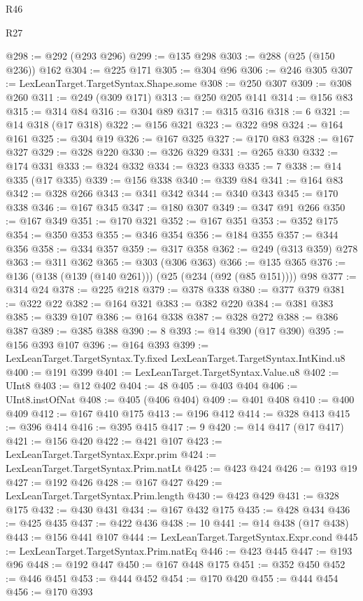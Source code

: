 \begin{lexlean}{R46}
\begin{lexlean}{R27}
\begin{coremodule}
{{{{{{{{{{{{{{{{{{{{{{{{{{{{{{{{{{{{{{{{{{{{{{{{{{{{{{{{{{{{{{@298 := @292 (@293 @296)
@299 := @135 @298
@303 := @288 (@25 (@150 @236)) @162
@304 := @225 @171
@305 := @304 @96
@306 := @246 @305
@307 := LexLeanTarget.TargetSyntax.Shape.some
@308 := @250 @307
@309 := @308 @260
@311 := @249 (@309 @171)
@313 := @250 @205 @141
@314 := @156 @83
@315 := @314 @84
@316 := @304 @89
@317 := @315 @316
@318 := 6
@321 := @14 @318 (@17 @318)
@322 := @156 @321
@323 := @322 @98
@324 := @164 @161
@325 := @304 @19
@326 := @167 @325
@327 := @170 @83
@328 := @167 @327
@329 := @328 @220
@330 := @326 @329
@331 := @265 @330
@332 := @174 @331
@333 := @324 @332
@334 := @323 @333
@335 := 7
@338 := @14 @335 (@17 @335)
@339 := @156 @338
@340 := @339 @84
@341 := @164 @83
@342 := @328 @266
@343 := @341 @342
@344 := @340 @343
@345 := @170 @338
@346 := @167 @345
@347 := @180 @307
@349 := @347 @91 @266
@350 := @167 @349
@351 := @170 @321
@352 := @167 @351
@353 := @352 @175
@354 := @350 @353
@355 := @346 @354
@356 := @184 @355
@357 := @344 @356
@358 := @334 @357
@359 := @317 @358
@362 := @249 (@313 @359) @278
@363 := @311 @362
@365 := @303 (@306 @363)
@366 := @135 @365
@376 := @136 (@138 (@139 (@140 @261))) (@25 (@234 (@92 (@85 @151)))) @98
@377 := @314 @24
@378 := @225 @218
@379 := @378 @338
@380 := @377 @379
@381 := @322 @22
@382 := @164 @321
@383 := @382 @220
@384 := @381 @383
@385 := @339 @107
@386 := @164 @338
@387 := @328 @272
@388 := @386 @387
@389 := @385 @388
@390 := 8
@393 := @14 @390 (@17 @390)
@395 := @156 @393 @107
@396 := @164 @393
@399 := LexLeanTarget.TargetSyntax.Ty.fixed LexLeanTarget.TargetSyntax.IntKind.u8
@400 := @191 @399
@401 := LexLeanTarget.TargetSyntax.Value.u8
@402 := UInt8
@403 := @12 @402
@404 := 48
@405 := @403 @404
@406 := UInt8.instOfNat
@408 := @405 (@406 @404)
@409 := @401 @408
@410 := @400 @409
@412 := @167 @410 @175
@413 := @196 @412
@414 := @328 @413
@415 := @396 @414
@416 := @395 @415
@417 := 9
@420 := @14 @417 (@17 @417)
@421 := @156 @420
@422 := @421 @107
@423 := LexLeanTarget.TargetSyntax.Expr.prim
@424 := LexLeanTarget.TargetSyntax.Prim.natLt
@425 := @423 @424
@426 := @193 @19
@427 := @192 @426
@428 := @167 @427
@429 := LexLeanTarget.TargetSyntax.Prim.length
@430 := @423 @429
@431 := @328 @175
@432 := @430 @431
@434 := @167 @432 @175
@435 := @428 @434
@436 := @425 @435
@437 := @422 @436
@438 := 10
@441 := @14 @438 (@17 @438)
@443 := @156 @441 @107
@444 := LexLeanTarget.TargetSyntax.Expr.cond
@445 := LexLeanTarget.TargetSyntax.Prim.natEq
@446 := @423 @445
@447 := @193 @96
@448 := @192 @447
@450 := @167 @448 @175
@451 := @352 @450
@452 := @446 @451
@453 := @444 @452
@454 := @170 @420
@455 := @444 @454
@456 := @170 @393
}}}}}}}}}}}}}}}}}}}}}}}}}}}}}}}}}}}}}}}}}}}}}}}}}}}}}}}}}}}}}}
\end{coremodule}
\end{lexlean}
\end{lexlean}
